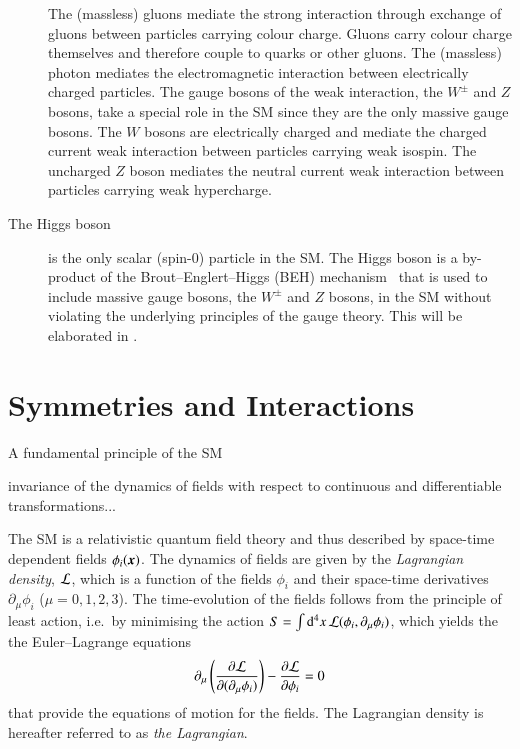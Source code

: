 \begin{description}
  The (massless) gluons mediate the strong interaction through exchange of
  gluons between particles carrying colour charge. Gluons carry colour charge
  themselves and therefore couple to quarks or other gluons. The (massless)
  photon mediates the electromagnetic interaction between electrically charged
  particles. The gauge bosons of the weak interaction, the $W^\pm$ and $Z$
  bosons, take a special role in the SM since they are the only massive gauge
  bosons. The $W$ bosons are electrically charged and mediate the charged
  current weak interaction between particles carrying weak isospin. The
  uncharged $Z$ boson mediates the neutral current weak interaction between
  particles carrying weak hypercharge.

\item[The Higgs boson] is the only scalar (spin-$0$) particle in the SM. The
  Higgs boson is a by-product of the Brout--Englert--Higgs (BEH)
  mechanism~\cite{Englert:1964et,Higgs:1964pj} that is used to include massive
  gauge bosons, the $W^\pm$ and $Z$ bosons, in the SM without violating the
  underlying principles of the gauge theory. This will be elaborated in
  .

\end{description}


\section{Symmetries and Interactions}
\label{sec:theo_symmetries_interactions}

A fundamental principle of the SM

invariance of the dynamics of fields with respect to continuous and
differentiable transformations...


The SM is a relativistic quantum field theory and thus described by space-time
dependent fields $\phi_i(\myvec{x})$. The dynamics of fields are given by the
\emph{Lagrangian density}, $\mathcal{L}$, which is a function of the fields
$\phi_i$ and their space-time derivatives $\partial_\mu \phi_i$
($\mu = 0, 1, 2, 3$). The time-evolution of the fields follows from the
principle of least action, i.e.\ by minimising the action
$S = \int \mathrm{d}^4x \, \mathcal{L}(\phi_i, \partial_\mu \phi_i)$, which yields
the the Euler--Lagrange equations
\begin{align*}
  \partial_{\mu} \left( \frac{\partial \mathcal{L}}{\partial (\partial_{\mu} \phi_i)} \right) - \frac{\partial \mathcal{L}}{\partial \phi_i} = 0
\end{align*} that provide the equations of motion for the fields. The Lagrangian density is
hereafter referred to as \emph{the Lagrangian}.

